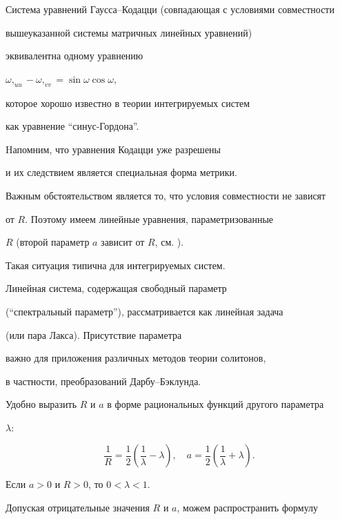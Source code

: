 Система уравнений Гаусса--Кодацци (совпадающая с условиями совместности


вышеуказанной системы матричных линейных уравнений)


эквивалентна одному уравнению


$\omega,_{uu} - \omega,_{vv} = \sin\omega \cos\omega$,


которое хорошо известно в теории интегрируемых систем 


как уравнение ``синус-Гордона''. 


Hапомним, что уравнения Кодацци уже разрешены


и их следствием является специальная форма метрики.





Важным обстоятельством является то, что условия совместности не зависят


от $R$. Поэтому имеем линейные уравнения, параметризованные


$R$ (второй параметр $a$ зависит от $R$, см. ).


Такая ситуация типична для интегрируемых систем.


Линейная система, содержащая свободный параметр


(``спектральный параметр''), рассматривается как линейная задача


(или пара Лакса). Присутствие параметра


важно для приложения различных методов теории солитонов,


в частности, преобразований Дарбу--Бэклунда.





Удобно выразить $R$ и $a$ в форме рациональных функций другого параметра


$\lambda$:


\begin{equation}


\label{R-a-lambda}


\frac{1}{R} = \frac{1}{2} \left( \frac{1}{\lambda} - \lambda \right),


\quad a = \frac{1}{2} \left( \frac{1}{\lambda} + \lambda \right).


\end{equation}


Если $a > 0$ и $R > 0$, то $0 < \lambda < 1$.


Допуская отрицательные значения $R$ и $a$, можем распространить формулу



